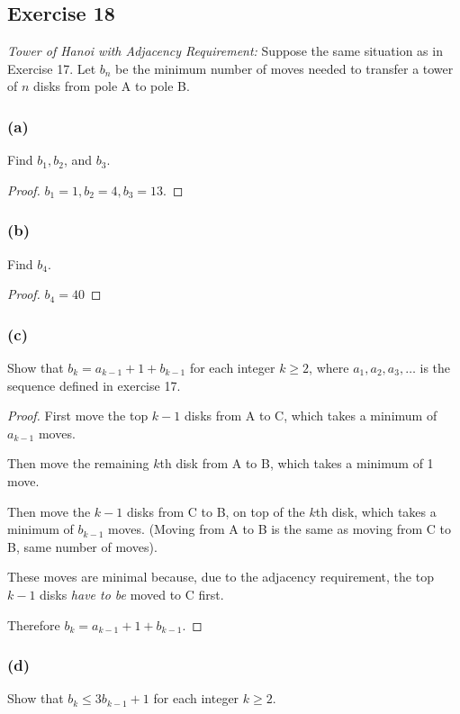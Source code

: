\documentclass[14pt]{extarticle}
\begin{document}
\subsection{Exercise 18}
{\it Tower of Hanoi with Adjacency Requirement:} Suppose the same situation as in Exercise 17. Let $b_n$ be the minimum number of moves needed to transfer a tower of $n$ disks from pole A to pole B.

\subsubsection{(a)}
Find $b_1, b_2$, and $b_3$.

\begin{proof}
$b_1 = 1, b_2 = 4, b_3 = 13$.
\end{proof}

\subsubsection{(b)}
Find $b_4$.

\begin{proof}
$b_4 = 40$
\end{proof}

\subsubsection{(c)}
Show that $b_k = a_{k - 1} + 1 + b_{k - 1}$ for each integer $k \geq 2$, where $a_1, a_2, a_3, \ldots$ is the 
sequence defined in exercise 17.

\begin{proof}
First move the top $k-1$ disks from A to C, which takes a minimum of $a_{k-1}$ moves.

Then move the remaining $k$th disk from A to B, which takes a minimum of 1 move.

Then move the $k-1$ disks from C to B, on top of the $k$th disk, which takes a minimum of $b_{k-1}$ moves.
(Moving from A to B is the same as moving from C to B, same number of moves).

These moves are minimal because, due to the adjacency requirement, the top $k-1$ disks {\it have to be} moved
to C first.

Therefore $b_k = a_{k - 1} + 1 + b_{k - 1}$.
\end{proof}

\subsubsection{(d)}
Show that $b_k \leq 3b_{k - 1} + 1$ for each integer $k \geq 2$.
\end{document}
